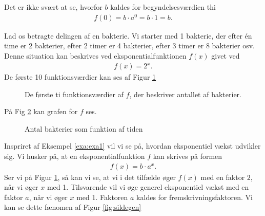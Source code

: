 Det er ikke svært at se, hvorfor $b$ kaldes for begyndelsesværdien thi
\begin{align*}
	f(0) = b\cdot a^0 = b\cdot 1 = b.
\end{align*}

\begin{exa}\label{exa:exa1}
Lad os betragte delingen af en bakterie. Vi starter med 1 bakterie, der efter én time er 2 bakterier, efter 2 timer er 4 bakterier, efter 3 timer er 8 bakterier osv. Denne situation kan beskrives ved eksponentialfunktionen $f(x)$ givet ved
\begin{align*}
f(x) = 2^x.
\end{align*}
De første 10 funktionsværdier kan ses af Figur \ref{fig:sildebenfold}
\begin{figure}[H]
\center
{}
\caption{De første ti funktionsværdier af $f$, der beskriver antallet af bakterier. }
\label{fig:sildebenfold}
\end{figure}
På Fig \ref{fig:flagxfold} kan grafen for $f$ ses. 
\begin{figure}[H]
\center
{}
\caption{Antal bakterier som funktion af tiden}
\label{fig:flagxfold}
\end{figure}
\end{exa}
Inspriret af Eksempel \ref{exa:exa1} vil vi se på, hvordan eksponentiel vækst udvikler sig. Vi husker på, at en eksponentialfunktion $f$ kan skrives på formen
\begin{align*}
f(x) = b\cdot a^x.
\end{align*}
Ser vi på Figur \ref{fig:sildebenfold}, så kan vi se, at vi i det tilfælde øger $f(x)$ med en faktor $2$, når vi øger $x$ med 1. Tilsvarende vil vi øge generel eksponentiel vækst med en faktor $a$, når vi øger $x$ med 1. Faktoren $a$ kaldes for fremskrivningsfaktoren. Vi kan se dette fænomen af Figur \ref{fig:sildegen}
